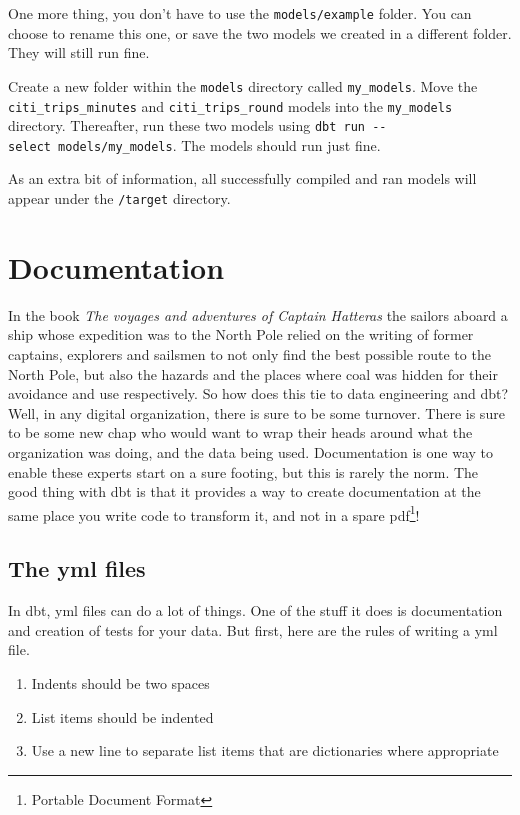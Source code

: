 \documentclass[
]{book}
\begin{document}
One more thing, you don't have to use the \texttt{models/example} folder. You can choose to rename this one, or save the two models we created in a different folder. They will still run fine.

Create a new folder within the \texttt{models} directory called \texttt{my\_models}. Move the \texttt{citi\_trips\_minutes} and \texttt{citi\_trips\_round} models into the \texttt{my\_models} directory. Thereafter, run these two models using \texttt{dbt\ run\ -\/-select\ models/my\_models}. The models should run just fine.

As an extra bit of information, all successfully compiled and ran models will appear under the \texttt{/target} directory.

\hypertarget{documentation-1}{%
\chapter{Documentation}\label{documentation-1}}

In the book \emph{The voyages and adventures of Captain Hatteras} the sailors aboard a ship whose expedition was to the North Pole relied on the writing of former captains, explorers and sailsmen to not only find the best possible route to the North Pole, but also the hazards and the places where coal was hidden for their avoidance and use respectively. So how does this tie to data engineering and dbt? Well, in any digital organization, there is sure to be some turnover. There is sure to be some new chap who would want to wrap their heads around what the organization was doing, and the data being used. Documentation is one way to enable these experts start on a sure footing, but this is rarely the norm. The good thing with dbt is that it provides a way to create documentation at the same place you write code to transform it, and not in a spare pdf\footnote{Portable Document Format}!

\hypertarget{the-yml-files}{%
\section{The yml files}\label{the-yml-files}}

In dbt, yml files can do a lot of things. One of the stuff it does is documentation and creation of tests for your data. But first, here are the rules of writing a yml file.

\begin{enumerate}
\def\labelenumi{\arabic{enumi}.}
\item
  Indents should be two spaces
\item
  List items should be indented
\item
  Use a new line to separate list items that are dictionaries where appropriate
\end{enumerate}
\end{document}

